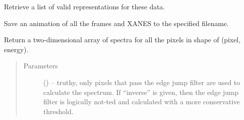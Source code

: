 \documentclass[letterpaper,10pt,english]{sphinxmanual}
\begin{document}
\begin{fulllineitems}
\begin{fulllineitems}
\label{\detokenize{xanespy:xanespy.xanes_frameset.XanesFrameset.qt_viewer}}
\end{fulllineitems}


\begin{fulllineitems}
\label{\detokenize{xanespy:xanespy.xanes_frameset.XanesFrameset.representations}}
Retrieve a list of valid representations for these data.

\end{fulllineitems}


\begin{fulllineitems}
\label{\detokenize{xanespy:xanespy.xanes_frameset.XanesFrameset.save_movie}}
Save an animation of all the frames and XANES to the specified
filename.

\end{fulllineitems}


\begin{fulllineitems}
\label{\detokenize{xanespy:xanespy.xanes_frameset.XanesFrameset.spectra}}
Return a two-dimensional array of spectra for all the pixels in
shape of (pixel, energy).
\begin{quote}\begin{description}
\item[{Parameters}] \leavevmode
\sphinxstyleliteralstrong{}\sphinxstyleliteralstrong{(}\sphinxstyleliteralstrong{)}\sphinxstyleliteralstrong{} () -- truthy, only pixels that pass the edge jump filter are
used to calculate the spectrum. If ``inverse'' is given,
then the edge jump filter is logically not-ted and
calculated with a more conservative threshold.

\end{description}\end{quote}


\end{fulllineitems}
\end{fulllineitems}
\end{document}
